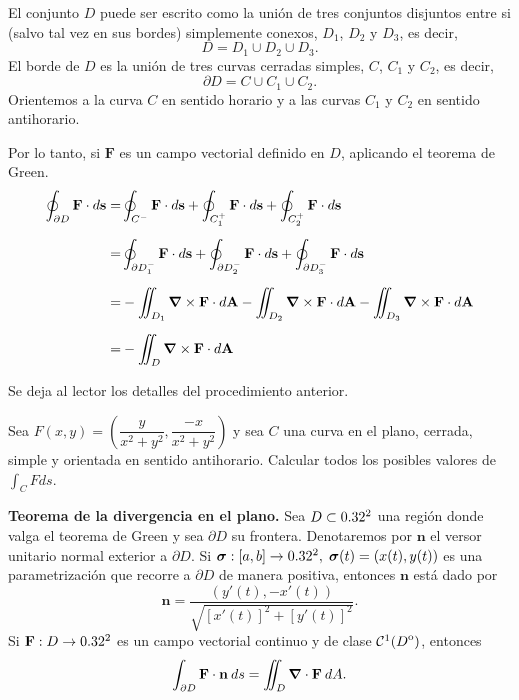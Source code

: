 \begin{obs}
El conjunto $D$ puede ser escrito como la uni\'on de tres conjuntos  disjuntos entre si (salvo tal vez en sus bordes) simplemente conexos,  $D_1$, $D_2$ y $D_3$, es decir,  $$D =D_1\cup D_2\cup D_3.$$  El borde de $D$ es la uni\'on de tres curvas cerradas simples,   $C$, $C_1$ y $C_2$, es decir,  $$\partial D=C\cup C_1\cup C_2.$$
Orientemos a la curva  $C$ en sentido horario y a las curvas  $C_1$ y $C_2$  en sentido  antihorario.  

Por lo tanto, si $\mathbf{F}$ es un campo vectorial definido en $D$, aplicando el teorema de Green.
    \begin{align*}
        \oint_{\partial D} \mathbf{F}\cdot d\mathbf{s}=&\oint_{C^{-}}\mathbf{F}\cdot d\mathbf{s}+\oint_{C_1^{+}}\mathbf{F}\cdot d\mathbf{s}+\oint_{C_2^{+}}\mathbf{F}\cdot d\mathbf{s}\\[.2cm]
        =&\oint_{\partial D_1^{-}}\mathbf{F}\cdot d\mathbf{s}+\oint_{\partial D_2^{-}}\mathbf{F}\cdot d\mathbf{s}+\oint_{\partial D_3^{-}}\mathbf{F}\cdot d\mathbf{s}\\[.2cm]
        =&-\iint_{ D_1}\grad\times\mathbf{F}\cdot d\mathbf{A}-\iint_{ D_2}\grad\times\mathbf{F}\cdot d\mathbf{A}-\iint_{ D_3}\grad\times\mathbf{F}\cdot d\mathbf{A}\\[.2cm]
        =&-\iint_D \grad\times\mathbf{F}\cdot d\mathbf{A}
    \end{align*}
\end{obs}

Se deja al lector los detalles del procedimiento anterior. 

\begin{tarea}
Sea $F(x,y) = (\dfrac{y}{x^{2}+y^{2}},\dfrac{-x}{x^{2}+y^{2}})$ y sea $C$ una curva en el plano, cerrada, simple y orientada en sentido antihorario. Calcular todos  los posibles valores de $\int_{C} F ds.$
\end{tarea}


\begin{theorem}
\textbf{Teorema de la divergencia en el plano.} Sea $D\subset0.32^2$ una regi\'on donde valga el teorema de Green y sea $\partial D$ su frontera. Denotaremos por $\mathbf{n}$ el versor unitario normal exterior a $\partial D$.  Si $\boldsymbol{\sigma}:[a,b]\to0.32^2,\;\boldsymbol{\sigma}(t)=(x(t),y(t))$ es una parametrizaci\'on que recorre a $\partial D$ de manera positiva,  entonces  $\mathbf{n}$ est\'a dado por 
\[
    \mathbf{n}=\frac{(y'(t),-x'(t))}{\sqrt{[x'(t)]^2+[y'(t)]^2}}.
\]
Si $\mathbf{F}:  D\to 0.32^2$ es un campo vectorial continuo y de clase $\mathcal{C}^1({\kern0ptD}^{\mathrm{o}})$,  entonces
\[
    \int_{\partial D}\mathbf{F}\cdot\mathbf{n}\:ds=\iint_D\grad\cdot\mathbf{F}\:dA.
\]
\end{theorem}

